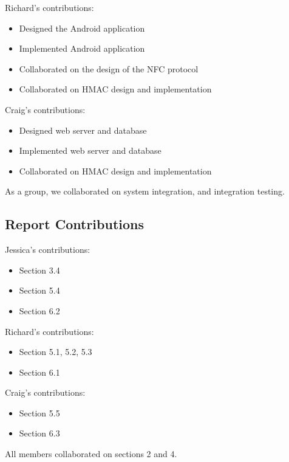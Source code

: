 \documentclass[12pt]{report}
\let\Oldsubsection\subsection
\renewcommand{\subsection}{\FloatBarrier\Oldsubsection}
\begin{document}
Richard's contributions:
\begin{itemize}
\item Designed the Android application
\item Implemented Android application
\item Collaborated on the design of the NFC protocol
\item Collaborated on HMAC design and implementation
\end{itemize}

Craig's contributions:
\begin{itemize}
\item Designed web server and database
\item Implemented web server and database
\item Collaborated on HMAC design and implementation
\end{itemize}

As a group, we collaborated on system integration, and integration testing.


\subsection{Report Contributions} \label{report-contributions}

Jessica's contributions:
\begin{itemize}
\item Section 3.4
\item Section 5.4
\item Section 6.2
\end{itemize}

Richard's contributions:
\begin{itemize}
\item Section 5.1, 5.2, 5.3
\item Section 6.1
\end{itemize}

Craig's contributions:
\begin{itemize}
\item Section 5.5
\item Section 6.3
\end{itemize}

All members collaborated on sections 2 and 4.

\end{document}
